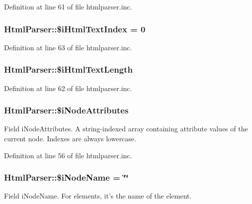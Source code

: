 Definition at line 61 of file htmlparser.\+inc.

\hypertarget{classHtmlParser_a63c9b906ce27db18ed26d121477998fe}{
\subsubsection[{\$i\+Html\+Text\+Index}]{\setlength{\rightskip}{0pt plus 5cm}Html\+Parser\+::\$i\+Html\+Text\+Index = 0}}\label{classHtmlParser_a63c9b906ce27db18ed26d121477998fe}


Definition at line 63 of file htmlparser.\+inc.

\hypertarget{classHtmlParser_a35d1c8bba530b89ceaf92b5c56a80620}{
\subsubsection[{\$i\+Html\+Text\+Length}]{\setlength{\rightskip}{0pt plus 5cm}Html\+Parser\+::\$i\+Html\+Text\+Length}}\label{classHtmlParser_a35d1c8bba530b89ceaf92b5c56a80620}


Definition at line 62 of file htmlparser.\+inc.

\hypertarget{classHtmlParser_a9ad344053ffa134d3e2265c891cbc1e3}{
\subsubsection[{\$i\+Node\+Attributes}]{\setlength{\rightskip}{0pt plus 5cm}Html\+Parser\+::\$i\+Node\+Attributes}}\label{classHtmlParser_a9ad344053ffa134d3e2265c891cbc1e3}
Field i\+Node\+Attributes. A string-\/indexed array containing attribute values of the current node. Indexes are always lowercase. 

Definition at line 56 of file htmlparser.\+inc.

\hypertarget{classHtmlParser_a1a479b30cf83744fcd8298abca4c9f5d}{
\subsubsection[{\$i\+Node\+Name}]{\setlength{\rightskip}{0pt plus 5cm}Html\+Parser\+::\$i\+Node\+Name = \char`\"{}\char`\"{}}}\label{classHtmlParser_a1a479b30cf83744fcd8298abca4c9f5d}
Field i\+Node\+Name. For elements, it's the name of the element. 

